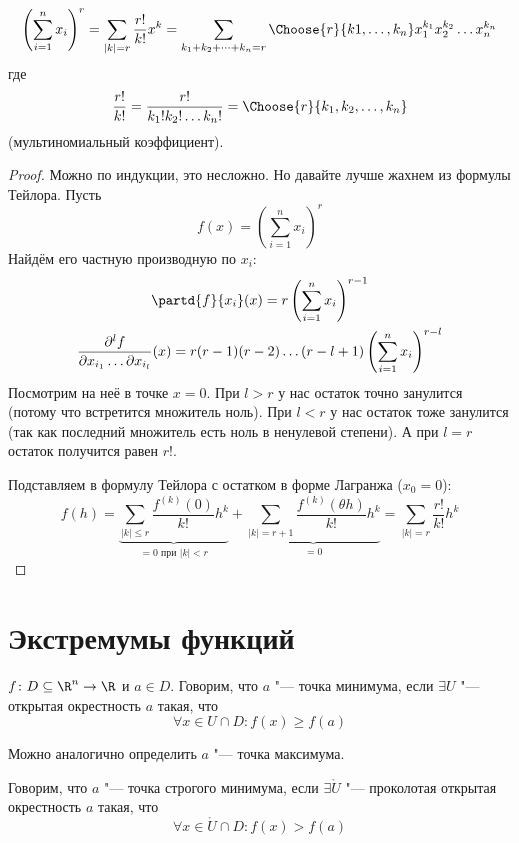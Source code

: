 \begin{theorem}
	\[
		\left(\sum_{i=1}^n x_i\right)^r = \sum_{|k|=r} \frac{r!}{k!} x^k = \sum_{k_1+k_2+\dots+k_n=r}\Choose{r}{k1, \dots, k_n}
			x_1^{k_1}x_2^{k_2}\dots x_n^{k_n}
	\]
	где
	\[ \frac{r!}{k!} = \frac{r!}{k_1!k_2!\dots k_n!} = \Choose{r}{k_1, k_2, \dots, k_n}\]
	(мультиномиальный коэффициент).
\end{theorem}
\begin{proof}
	Можно по индукции, это несложно.
	Но давайте лучше жахнем из формулы Тейлора.
	Пусть
	\[ f(x)=\left( \sum_{i=1}^n x_i \right)^r \]
	Найдём его частную производную по $x_i$:
	\begin{gather*}
		\partd{f}{x_i} (x) = r \left( \sum_{i=1}^n x_i \right)^{r-1} \\
		\frac{\partial ^ l f}{\partial x_{i_1} \dots \partial x_{i_l}} (x) = r(r-1)(r-2)\dots(r-l+1) \left( \sum_{i=1}^n x_i \right)^{r-l} \\
	\end{gather*}
	Посмотрим на неё в точке $x=0$.
	При $l>r$ у нас остаток точно занулится (потому что встретится множитель ноль).
	При $l<r$ у нас остаток тоже занулится (так как последний множитель есть ноль в ненулевой степени).
	А при $l=r$ остаток получится равен $r!$.

	Подставляем в формулу Тейлора с остатком в форме Лагранжа ($x_0=0$):
	\[
		f(h)
			= \underbrace{\sum_{|k| \le r} \frac{f^{(k)}(0)}{k!} h^k}_{=0\text{~при~}|k|<r}
			+ \underbrace{\sum_{|k|=r+1} \frac{f^{(k)}(\theta h)}{k!} h^k}_{=0}
			= \sum_{|k|=r} \frac{r!}{k!} h^k
	\]
\end{proof}

\section{Экстремумы функций}
\begin{Def}
	$f \colon D \subseteq \R^n \to \R$ и $a \in D$.
	Говорим, что $a$ "--- точка минимума, если $\exists U$ "--- открытая окрестность $a$ такая, что
	\[ \forall x \in U \cap D \colon f(x) \ge f(a) \]
\end{Def}
\begin{Rem}
	Можно аналогично определить $a$ "--- точка максимума.
\end{Rem}
\begin{Def}
	Говорим, что $a$ "--- точка строгого минимума, если $\exists \mathring U$ "--- проколотая открытая окрестность $a$ такая, что
	\[ \forall x \in \mathring U \cap D \colon f(x) > f(a) \]
\end{Def}

